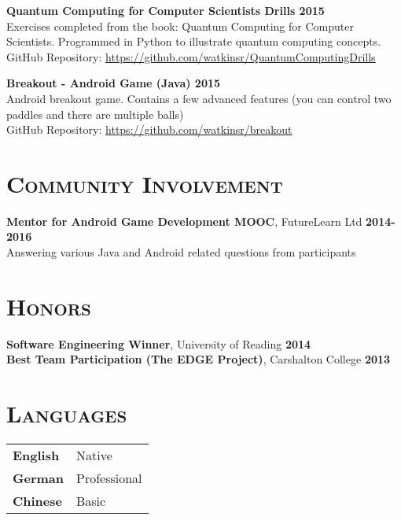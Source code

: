 \documentclass[line, margin, 10pt]{res}
\begin{document}
\begin{resume}
\\\\\\\\\\
{\bf Quantum Computing for Computer Scientists Drills {\bf \hfill 2015}} \\
Exercises completed from the book: Quantum Computing for Computer Scientists. Programmed in Python to illustrate quantum computing concepts.\\
GitHub Repository: \url{https://github.com/watkinsr/QuantumComputingDrills}

{\bf Breakout - Android Game (Java) {\bf \hfill 2015}} \\
Android breakout game. Contains a few advanced features (you can control two paddles and there are multiple balls)\\
GitHub Repository: \url{https://github.com/watkinsr/breakout}

\section{\textsc{Community Involvement}}

{\bf Mentor for Android Game Development MOOC}, FutureLearn Ltd {\bf \hfill 2014-2016}\\
Answering various Java and Android related questions from participants

\section{\textsc{Honors}}

{\bf Software Engineering Winner}, University of Reading {\bf \hfill 2014}\\
{\bf Best Team Participation (The EDGE Project)}, Carshalton College {\bf \hfill 2013}

\section{\textsc{Languages}}
\begin{tabular}[t]{@{} p{1.2in} p{3.75in} @{}}

\textbf{English} & Native\\ 
\textbf{German} & Professional\\ \textbf{Chinese} & Basic

\end{tabular}

\end{resume}
\end{document}

